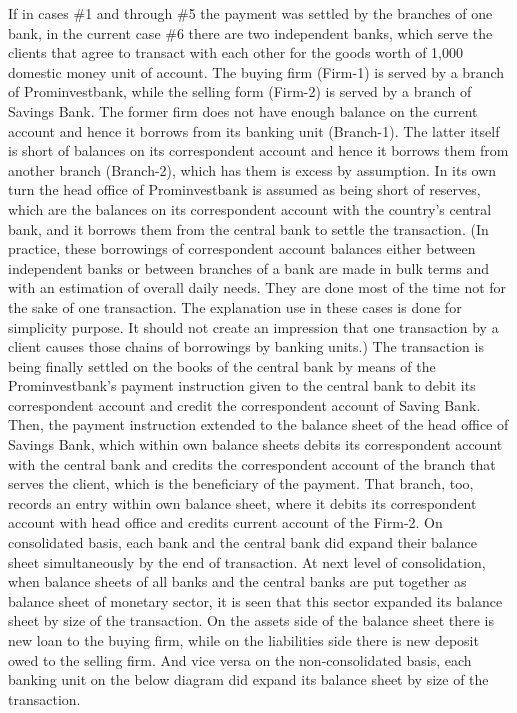 If in cases \#1 and through \#5 the payment was settled by the branches of one bank, in the current case \#6 there are two independent banks, which serve the clients that agree to transact with each other for the goods worth of 1,000 domestic money unit of account. The buying firm (Firm-1) is served by a branch of Prominvestbank, while the selling form (Firm-2) is served by a branch of Savings Bank. The former firm does not have enough balance on the current account and hence it borrows from its banking unit (Branch-1). The latter itself is short of balances on its correspondent account and hence it borrows them from another branch (Branch-2), which has them is excess by assumption. In its own turn the head office of Prominvestbank is assumed as being short of reserves, which are the balances on its correspondent account with the country's central bank, and it borrows them from the central bank to settle the transaction. (In practice, these borrowings of correspondent account balances either between independent banks or between branches of a bank are made in bulk terms and with an estimation of overall daily needs. They are done most of the time not for the sake of one transaction. The explanation use in these cases is done for simplicity purpose. It should not create an impression that one transaction by a client causes those chains of borrowings by banking units.) The transaction is being finally settled on the books of the central bank by means of the Prominvestbank's payment instruction given to the central bank to debit its correspondent account and credit the correspondent account of Saving Bank. Then, the payment instruction extended to the balance sheet of the head office of Savings Bank, which within own balance sheets debits its correspondent account with the central bank and credits the correspondent account of the branch that serves the client, which is the beneficiary of the payment. That branch, too, records an entry within own balance sheet, where it debits its correspondent account with head office and credits current account of the Firm-2. On consolidated basis, each bank and the central bank did expand their balance sheet simultaneously by the end of transaction. At next level of consolidation, when balance sheets of all banks and the central banks are put together as balance sheet of monetary sector, it is seen that this sector expanded its balance sheet by size of the transaction. On the assets side of the balance sheet there is new loan to the buying firm, while on the liabilities side there is new deposit owed to the selling firm. And vice versa on the non-consolidated basis, each banking unit on the below diagram did expand its balance sheet by size of the transaction.

